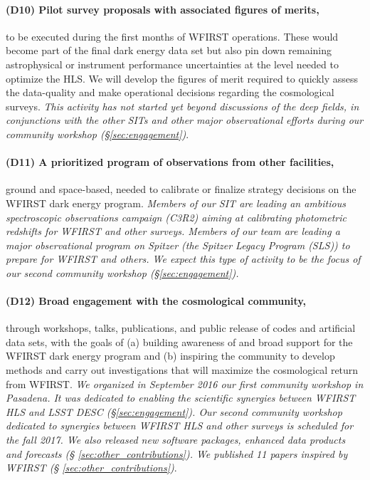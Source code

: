 \paragraph*{(D10) Pilot survey proposals with associated figures of merits,} to
be executed during the first months of WFIRST operations. These would become
part of the final dark energy data set but also pin down remaining astrophysical
or instrument performance uncertainties at the level needed to optimize the HLS.
We will develop the figures of merit required to quickly assess the data-quality
and make operational decisions regarding the cosmological surveys. \emph{This
activity has not started yet beyond discussions of the deep fields, in
conjunctions with the other SITs and other major observational efforts during
our community workshop (\S \ref{sec:engagement})}.

\paragraph*{(D11) A prioritized program of observations from other facilities,}
ground and space-based, needed to calibrate or finalize strategy decisions on
the WFIRST dark energy program. \emph{Members of our SIT are leading an
ambitious spectroscopic observations campaign (C3R2) aiming at calibrating photometric redshifts
for WFIRST and other surveys. Members of our team are leading a major
observational program on Spitzer (the Spitzer Legacy Program (SLS)) to prepare for WFIRST and others. We expect this type of activity to be the focus of our second community workshop (\S \ref{sec:engagement}).}

\paragraph*{(D12) Broad engagement with the cosmological community,} through
workshops, talks, publications, and public release of codes and artificial data
sets, with the goals of (a) building awareness of and broad support for the
WFIRST dark energy program and (b) inspiring the community to develop methods
and carry out investigations that will maximize the cosmological return from
WFIRST. \emph{We organized in September 2016 our first community workshop in
Pasadena. It was dedicated to enabling the scientific synergies between WFIRST HLS and
LSST DESC (\S \ref{sec:engagement}). Our second community workshop dedicated to
synergies between WFIRST HLS and other surveys is scheduled for the fall 2017. We also
released new software packages, enhanced data products and forecasts (\S
\ref{sec:other_contributions}). We published 11 papers inspired by WFIRST (\S
\ref{sec:other_contributions})}.
